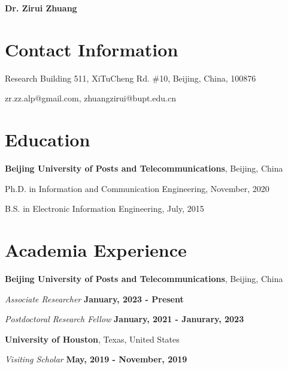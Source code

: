 \documentclass[letterpaper,11pt]{article}
\newcommand{\name}{Dr. Zirui Zhuang} %
\newcommand{\contentlength}{5.25in} %
\begin{document}
	\selectfont
	
	\textbf{\name}
	\section{\textbf{Contact Information}}
	\begin{tcolorbox}[flush right,breakable,colback=white,colframe=white,width=\contentlength]
		\parbox{3in}{
			Research Building 511, XiTuCheng Rd. \#10, Beijing, China, 100876
		}
		\hfill
		\parbox{2in}{
			zr.zz.alp@gmail.com, zhuangzirui@bupt.edu.cn
		}
	\end{tcolorbox}
		
	
	
	\section{\textbf{Education}}
	\begin{tcolorbox}[flush right,breakable,colback=white,colframe=white,width=\contentlength]
		\textbf{Beijing University of Posts and Telecommunications}, Beijing, China
		
		\quad Ph.D. in Information and Communication Engineering, November, 2020
		
		\quad B.S. in Electronic Information Engineering, July, 2015
	\end{tcolorbox}
	
	
	
	
	\section{\textbf{Academia Experience}}
	\begin{tcolorbox}[flush right,breakable,colback=white,colframe=white,width=\contentlength]
		\textbf{Beijing University of Posts and Telecommunications}, Beijing, China

		\quad \textit{Associate Researcher} \null\hfill \textbf{January, 2023 - Present}

		\quad \textit{Postdoctoral Research Fellow} \null\hfill \textbf{January, 2021 - Janurary, 2023}
		
		\textbf{University of Houston}, Texas, United States
		
		\quad \textit{Visiting Scholar} \null\hfill \textbf{May, 2019 - November, 2019}
	\end{tcolorbox}
	
\end{document}
